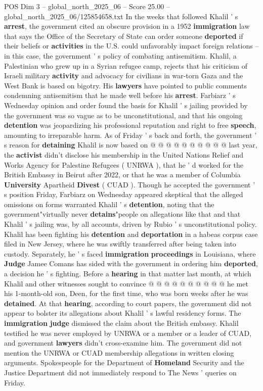 \begin{textsample}{POS Dim 3 – global\_north\_2025\_06 – Score 25.00 – global\_north\_2025\_06/125854658.txt}
In the weeks that followed Khalil ' s \textbf{arrest}, the government cited an obscure provision in a 1952 \textbf{immigration} law that says the Office of the Secretary of State can order someone \textbf{deported} if their beliefs or \textbf{activities} in the U.S. could unfavorably impact foreign relations -- in this case, the government ' s policy of combating antisemitism.
Khalil, a Palestinian who grew up in a Syrian refugee camp, rejects that his criticism of Israeli military \textbf{activity} and advocacy for civilians in war-torn Gaza and the West Bank is based on bigotry.
His \textbf{lawyers} have pointed to public comments condemning antisemitism that he made well before his \textbf{arrest}.
Farbiarz ' s Wednesday opinion and order found the basis for Khalil ' s jailing provided by the government was so vague as to be unconstitutional, and that his ongoing \textbf{detention} was jeopardizing his professional reputation and right to free \textbf{speech}, amounting to irreparable harm.
As of Friday ' s back and forth, the government ' s reason for \textbf{detaining} Khalil is now based on @ @ @ @ @ @ @ @ @ @ last year, the \textbf{activist} didn't disclose his membership in the United Nations Relief and Works Agency for Palestine Refugees ( UNRWA ), that he ' d worked for the British Embassy in Beirut after 2022, or that he was a member of Columbia \textbf{University} Apartheid \textbf{Divest} ( CUAD ).
Though he accepted the government ' s position Friday, Farbiarz on Wednesday appeared skeptical that the alleged omissions on forms warranted Khalil ' s \textbf{detention}, noting that the government"virtually never \textbf{detains}"people on allegations like that and that Khalil ' s jailing was, by all accounts, driven by Rubio ' s unconstitutional policy.
Khalil has been fighting his \textbf{detention} and \textbf{deportation} in a habeas corpus case filed in New Jersey, where he was swiftly transferred after being taken into custody.
Separately, he ' s faced \textbf{immigration} \textbf{proceedings} in Louisiana, where \textbf{Judge} Jamee Comans has sided with the government in ordering him \textbf{deported}, a decision he ' s fighting.
Before a \textbf{hearing} in that matter last month, at which Khalil and other witnesses sought to convince @ @ @ @ @ @ @ @ @ @ he met his 1-month-old son, Deen, for the first time, who was born weeks after he was \textbf{detained}.
At that \textbf{hearing}, according to court papers, the government did not appear to bolster its allegations about Khalil ' s lawful residency forms.
The \textbf{immigration} \textbf{judge} dismissed the claim about the British embassy.
Khalil testified he was never employed by UNRWA or a member or a leader of CUAD, and government \textbf{lawyers} didn't cross-examine him.
The government did not mention the UNRWA or CUAD membership allegations in written closing arguments.
Spokespeople for the Department of \textbf{Homeland} Security and the Justice Department did not immediately respond to The News ' queries on Friday.


\end{textsample}
